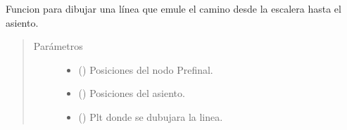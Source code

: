 \documentclass[letterpaper,10pt,spanish]{sphinxmanual}
\begin{document}
\begin{fulllineitems}
\label{\detokenize{Funciones:Funciones.dibujarRectaNodoPrefinal_Asiento}}
\sphinxAtStartPar
Funcion para dibujar una línea que emule el camino desde la escalera hasta el asiento.
\begin{quote}\begin{description}
\item[{Parámetros}] \leavevmode\begin{itemize}
\item {} 
\sphinxAtStartPar
{} () \textendash{} Posiciones del nodo Prefinal.

\item {} 
\sphinxAtStartPar
{} () \textendash{} Posiciones del asiento.

\item {} 
\sphinxAtStartPar
{} () \textendash{} Plt donde se dubujara la linea.

\end{itemize}

\end{description}\end{quote}

\end{fulllineitems}

\end{document}
